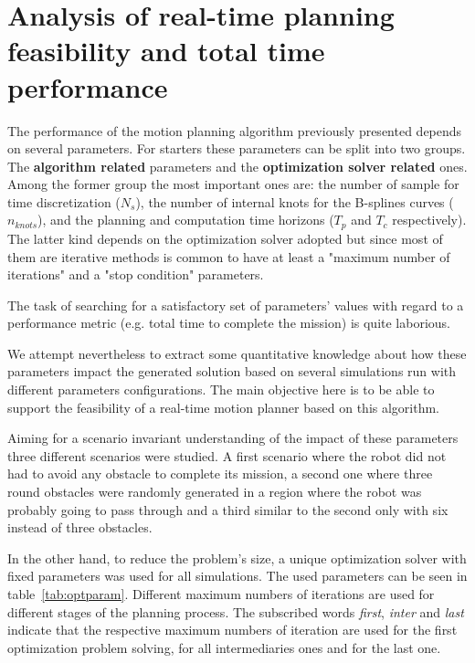 \section{Analysis of real-time planning feasibility and total time performance}

The performance of the motion planning algorithm previously presented depends on several parameters. For starters these parameters can be split into two groups. The \textbf{algorithm related} parameters and the \textbf{optimization solver related} ones. Among the former group the most important ones are: the number of sample for time discretization ($N_s$), the number of internal knots for the B-splines curves ($n_{knots}$), and the planning and computation time horizons ($T_p$ and $T_c$ respectively). The latter kind depends on the optimization solver adopted but since most of them are iterative methods is common to have at least a "maximum number of iterations" and a "stop condition" parameters.

The task of searching for a satisfactory set of parameters' values with regard to a performance metric (e.g. total time to complete the mission) is quite laborious.

We attempt nevertheless to extract some quantitative knowledge about how these parameters impact the generated solution based on several simulations run with different parameters configurations. The main objective here is to be able to support the feasibility of a real-time motion planner based on this algorithm.

Aiming for a scenario invariant understanding of the impact of these parameters three different scenarios were studied. A first scenario where the robot did not had to avoid any obstacle to complete its mission, a second one where three round obstacles were randomly generated in a region where the robot was probably going to pass through and a third similar to the second only with six instead of three obstacles.

In the other hand, to reduce the problem's size, a unique optimization solver with fixed parameters was used for all simulations. The used parameters can be seen in table~\ref{tab:optparam}. Different maximum numbers of iterations are used for different stages of the planning process. The subscribed words \textit{first}, \textit{inter} and \textit{last} indicate that the respective maximum numbers of iteration are used for the first optimization problem solving, for all intermediaries ones and for the last one.

